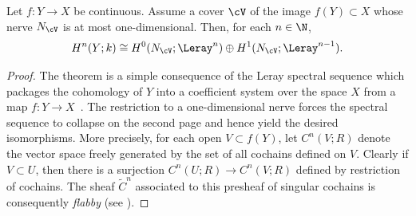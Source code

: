 \begin{thm}
\label{thm:leraysheaf}
	Let $f:Y \to X$ be continuous. Assume a cover $\cV$ of the image $f(Y) \subset X$ whose nerve $N_\cV$ is at most one-dimensional. Then, for each $n \in \N$,
\begin{equation*}
		H^{n}(Y;k) \cong H^0(N_\cV;\Leray^n) \oplus H^1(N_\cV;\Leray^{n-1}) .
\end{equation*}
\end{thm}
\begin{proof}
		The theorem is a simple consequence of the Leray spectral sequence which packages the cohomology of $Y$ into a coefficient system over the space $X$ from a map $f:Y\to X$~\cite{mccleary}. The restriction to a one-dimensional nerve forces the spectral sequence to collapse on the second page and hence yield the desired isomorphisms. More precisely, for each open $V\subset f(Y)$, let $C^n(V;R)$ denote the vector space freely generated by the set of all cochains defined on $V$. Clearly if $V \subset U$, then there is a surjection $C^n(U;R) \to C^n(V;R)$ defined by restriction of cochains. The sheaf $\widetilde{C}^n$ associated to this presheaf of singular cochains is consequently {\em flabby} (see \cite[p.~97]{ramanan2005global}).
		

\end{proof}

